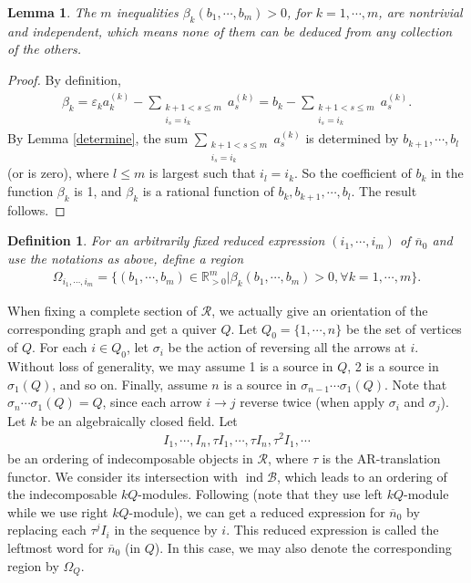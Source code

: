 \documentclass[12pt]{amsart}
\newtheorem{lemma}[theorem]{Lemma}
\newtheorem{definition}[theorem]{Definition}
\begin{document}
\begin{lemma}
    The $m$ inequalities $\beta_k(b_1,\cdots,b_m)>0$, for $k=1,\cdots,m$, are nontrivial and independent, which means none of them can be deduced from any collection of the others.
\end{lemma}

\begin{proof}
    By definition,
    \begin{align*}
    \beta_{k}= \varepsilon_{k}a_{k}^{(k)} - \sum_{\substack{k+1<s\leq m\\i_s=i_{k}}} a_s^{(k)} = b_{k}-\sum_{\substack{k+1<s\leq m\\i_s=i_{k}}} a_s^{(k)} .
    \end{align*}
    By Lemma \ref{determine}, the sum $\sum_{\substack{k+1<s\leq m\\i_s=i_{k}}} a_s^{(k)}$ is determined by $b_{k+1},\cdots,b_l$ (or is zero), where $l\leq m$ is largest such that $i_l=i_k$.
    So the coefficient of $b_k$ in the function $\beta_k$ is 1, and $\beta_k$ is a rational function of $b_k,b_{k+1},\cdots,b_l$. 
    The result follows.
\end{proof}


\begin{definition}
    For an arbitrarily fixed reduced expression $(i_1,\cdots,i_m)$ of $\overline{n}_0$ and use the notations as above, define a region 
    \begin{align*}
        \Omega_{i_1,\cdots,i_m} = \{ (b_1,\cdots,b_m)\in \mathbb{R}^m_{>0} | \beta_k(b_1,\cdots,b_m)>0, \forall k=1,\cdots,m  \}.
    \end{align*}
\end{definition}


When fixing a complete section of $\mathcal{R}$, we actually give an orientation of the corresponding graph and get a quiver $Q$. 
Let $Q_0=\{1,\cdots,n\}$ be the set of vertices of $Q$.
For each $i\in Q_0$, let $\sigma_i$ be the action of reversing all the arrows at $i$.
Without loss of generality, we may assume 1 is a source in $Q$, 2 is a source in $\sigma_1(Q)$, and so on. Finally, assume $n$ is a source in $\sigma_{n-1}\cdots\sigma_1(Q)$.
Note that $\sigma_n \cdots \sigma_1(Q)=Q$, since each arrow $i\rightarrow j$ reverse twice (when apply $\sigma_i$ and $\sigma_j$).
Let $k$ be an algebraically closed field.
Let
\begin{align*}
    I_1,\cdots,I_n,\tau I_1,\cdots,\tau I_n, \tau^2 I_1,\cdots
\end{align*}
be an ordering of indecomposable objects in $\mathcal{R}$, where $\tau$ is the AR-translation functor.
We consider its intersection with $\operatorname{ind}\mathcal{B}$, which leads to an ordering of the indecomposable $kQ$-modules.
Following \cite{ORT} (note that they use left $kQ$-module while we use right $kQ$-module), we can get a reduced expression for $\overline{n}_0$ by replacing each $\tau^jI_i$ in the sequence by $i$. This reduced expression is called the leftmost word for $\overline{n}_0$ (in $Q$).
In this case, we may also denote the corresponding region by  $\Omega_Q$.
\end{document}
